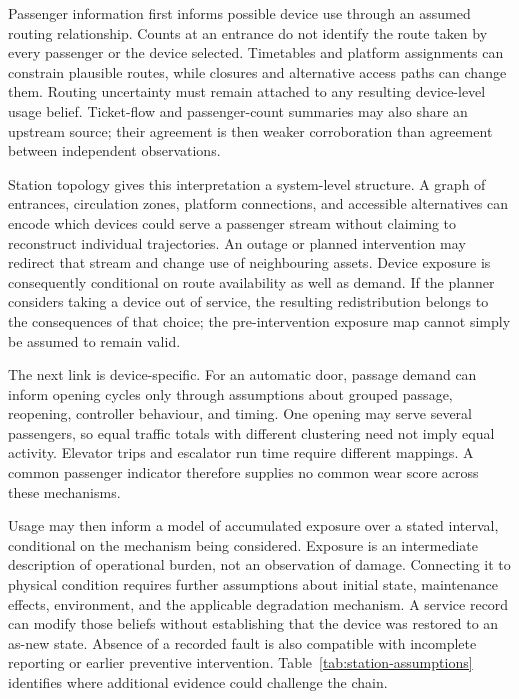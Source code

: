 \documentclass[symmetry,article,submit,pdftex,oneauthor]{Definitions/mdpi}
\begin{document}
Passenger information first informs possible device use through an assumed routing relationship. Counts at an entrance do not identify the route taken by every passenger or the device selected. Timetables and platform assignments can constrain plausible routes, while closures and alternative access paths can change them. Routing uncertainty must remain attached to any resulting device-level usage belief. Ticket-flow and passenger-count summaries may also share an upstream source; their agreement is then weaker corroboration than agreement between independent observations.

Station topology gives this interpretation a system-level structure. A graph of entrances, circulation zones, platform connections, and accessible alternatives can encode which devices could serve a passenger stream without claiming to reconstruct individual trajectories. An outage or planned intervention may redirect that stream and change use of neighbouring assets. Device exposure is consequently conditional on route availability as well as demand. If the planner considers taking a device out of service, the resulting redistribution belongs to the consequences of that choice; the pre-intervention exposure map cannot simply be assumed to remain valid.

The next link is device-specific. For an automatic door, passage demand can inform opening cycles only through assumptions about grouped passage, reopening, controller behaviour, and timing. One opening may serve several passengers, so equal traffic totals with different clustering need not imply equal activity. Elevator trips and escalator run time require different mappings. A common passenger indicator therefore supplies no common wear score across these mechanisms.

Usage may then inform a model of accumulated exposure over a stated interval, conditional on the mechanism being considered. Exposure is an intermediate description of operational burden, not an observation of damage. Connecting it to physical condition requires further assumptions about initial state, maintenance effects, environment, and the applicable degradation mechanism. A service record can modify those beliefs without establishing that the device was restored to an as-new state. Absence of a recorded fault is also compatible with incomplete reporting or earlier preventive intervention. Table~\ref{tab:station-assumptions} identifies where additional evidence could challenge the chain.
\end{document}
